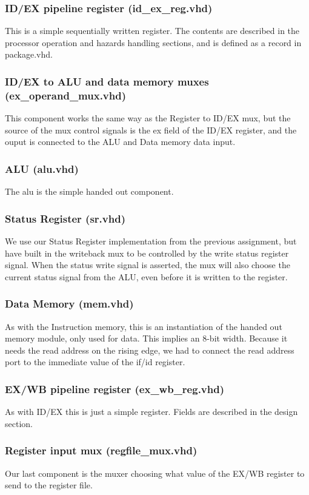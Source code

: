 \documentclass[11pt]{report}
\begin{document}
\subsubsection*{ID/EX pipeline register (id\_ex\_reg.vhd)}
This is a simple sequentially written register. The contents are described in the 
processor operation and hazards handling sections, and is defined as a record in package.vhd. 
\subsubsection*{ID/EX to ALU and data memory muxes (ex\_operand\_mux.vhd)}
This component works the same way as the Register to ID/EX mux, but the source of the 
mux control signals is the ex field of the ID/EX register, and the ouput is connected
to the ALU and Data memory data input.

\subsubsection*{ALU (alu.vhd)}
The alu is the simple handed out component.
\subsubsection*{Status Register (sr.vhd)}
We use our Status Register implementation from the previous assignment, but have
built in the writeback mux to be controlled by the write status register signal.
When the status write signal is asserted, the mux will also choose the current 
status signal from the ALU, even before it is written to the register.
\subsubsection*{Data Memory (mem.vhd)}
As with the Instruction memory, this is an instantiation of the handed out memory
module, only used for data. This implies an 8-bit width. Because it needs the read address
on the rising edge, we had to connect the read address port to the immediate value of the
if/id register.
\subsubsection*{EX/WB pipeline register (ex\_wb\_reg.vhd)}
As with ID/EX this is just a simple register. Fields are described in the design section.
\subsubsection*{Register input mux (regfile\_mux.vhd)}
Our last component is the muxer choosing what value of the EX/WB register to send to the
register file. 
\end{document}
